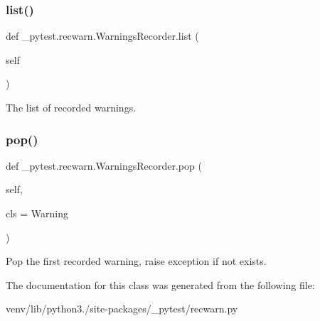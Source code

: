 \subsubsection{\texorpdfstring{list()}{list()}}
{\footnotesize\ttfamily def \+\_\+pytest.\+recwarn.\+Warnings\+Recorder.\+list (\begin{DoxyParamCaption}\item[{}]{self }\end{DoxyParamCaption})}

\begin{DoxyVerb}The list of recorded warnings.\end{DoxyVerb}
 \mbox{\label{class__pytest_1_1recwarn_1_1_warnings_recorder_ad217d042063980c4c7893e27f082a5d2}} 
\subsubsection{\texorpdfstring{pop()}{pop()}}
{\footnotesize\ttfamily def \+\_\+pytest.\+recwarn.\+Warnings\+Recorder.\+pop (\begin{DoxyParamCaption}\item[{}]{self,  }\item[{}]{cls = {\ttfamily Warning} }\end{DoxyParamCaption})}

\begin{DoxyVerb}Pop the first recorded warning, raise exception if not exists.\end{DoxyVerb}
 

The documentation for this class was generated from the following file\+:\begin{DoxyCompactItemize}
\item 
venv/lib/python3./site-\/packages/\+\_\+pytest/recwarn.\+py\end{DoxyCompactItemize}
